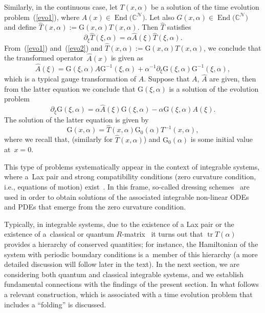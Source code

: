 \documentclass[pdftex]{sigma}
\numberwithin{equation}{section}
\theoremstyle{definition}
\DeclareMathOperator{\EEnd}{End}%
\begin{document}
Similarly, in the continuous case, let $T(x,\alpha)$ be a solution of the time evolution problem~(\ref{evo1}), where $A(x) \in \EEnd\bigl({\mathbb C}^{\mathcal N}\bigr)$. Let also $G(x, \alpha)\in \EEnd\bigl({\mathbb C}^{\mathcal N}\bigr)$ and define
$\hat T(x, \alpha) := {\mathrm G}(x, \alpha) T(x, \alpha)$. Then $ \hat T$ satisfies
\begin{equation}
\partial_{\xi} \hat T(\xi, \alpha)= \alpha \hat A(\xi) \hat T(\xi, \alpha). \label{evo2}
\end{equation}
From~(\ref{evo1}) and~(\ref{evo2}) and $\hat T(x, \alpha) := {\mathrm G}(x, \alpha) T(x, \alpha)$, we conclude that the transformed operator~$\hat A(x) $ is given as \begin{equation*}
\hat A(\xi) = {\mathrm G}(\xi, \alpha)A{\mathrm G}^{-1} (\xi, \alpha)+\alpha^{-1}\partial_{\xi} {\mathrm G}(\xi, \alpha){\mathrm G}^{-1}(\xi, \alpha), \nonumber
\end{equation*}
which is a {typical gauge transformation of $A$.}
Suppose that $A$, $\hat A$ are given, then from the latter equation we conclude that
${\mathrm G}(\xi,\alpha)$ is a solution of the evolution problem
\begin{equation}
\partial_{\xi} {\mathrm G}(\xi, \alpha) = \alpha\hat A(\xi) {\mathrm G}(\xi, \alpha) - \alpha {\mathrm G}(\xi, \alpha) A(\xi).\label{gaugeA}
\end{equation}
The solution of the latter equation is given by
\[
{\mathrm G}(x, \alpha) = \hat T(x, \alpha) {\mathrm G}_0(\alpha)T^{-1}(x, \alpha),
\]
 where we recall that,  (similarly for $\hat T(x, \alpha)$) and ${\mathrm G}_0(\alpha)$ is some initial value at~${x =0}$.

This type of problems systematically appear in the context of integrable systems, where a~Lax pair and strong compatibility conditions (zero curvature condition, i.e., equations of motion) exist~\cite{AKNS, FT, Lax}. In this frame, so-called dressing schemes~\cite{DS, MS, ZS} are used in order to obtain solutions of the associated integrable non-linear ODEs and PDEs that emerge from the zero curvature condition.

Typically, in integrable systems, due to the existence of a Lax pair or the existence of a~classical or quantum $R$-matrix~\cite{FT, FadTakRes} it turns out that $\operatorname{tr} T(\alpha)$ provides a hierarchy of conserved quantities; for instance, the Hamiltonian of the system with periodic boundary conditions is a~member of this hierarchy (a more detailed discussion will follow later in the text). In the next section, we are considering both quantum and classical integrable systems, and we establish fundamental connections with the findings of the present section. In what follows a relevant construction, which is associated with a time evolution problem that includes a ``folding'' is discussed.
\end{document}
